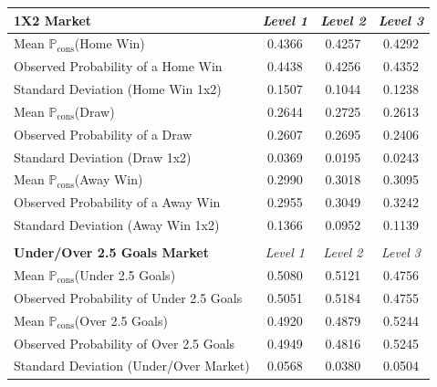\documentclass[a4paper,10pt]{report}
\begin{document}
\begin{table}[h!]\begin{center}\begin{tabular}[h!]{l||c|c|c}
\textbf{1X2 Market}& \textit{Level 1}& \textit{Level 2}& \textit{Level 3} \\ \hline
Mean $\mathbb{P}_{\textrm{cons}}$(Home Win) & 0.4366 & 0.4257 & 0.4292 \\ 
Observed Probability of a Home Win 			& 0.4438 & 0.4256 & 0.4352 \\ \hdashline
Standard Deviation (Home Win 1x2)			& 0.1507 & 0.1044 & 0.1238 \\ \hline

Mean $\mathbb{P}_{\textrm{cons}}$(Draw)	 	& 0.2644 & 0.2725 & 0.2613 \\ 
Observed Probability of a Draw	 			& 0.2607 & 0.2695 & 0.2406 \\ \hdashline
Standard Deviation (Draw 1x2)				& 0.0369 & 0.0195 & 0.0243 \\ \hline

Mean $\mathbb{P}_{\textrm{cons}}$(Away Win) & 0.2990 & 0.3018 & 0.3095 \\ 
Observed Probability of a Away Win	 		& 0.2955 & 0.3049 & 0.3242 \\ \hdashline
Standard Deviation (Away Win 1x2)			& 0.1366 & 0.0952 & 0.1139 \\ \hline \hline

\multicolumn{4}{l}{ } \\\hline
\textbf{Under/Over 2.5 Goals Market}& \textit{Level 1}&\textit{Level 2}& \textit{Level 3} \\ \hline
Mean $\mathbb{P}_{\textrm{cons}}$(Under 2.5 Goals)	& 0.5080 & 0.5121 & 0.4756 \\
Observed Probability of Under 2.5 Goals		& 0.5051 & 0.5184 & 0.4755 \\\hline
Mean $\mathbb{P}_{\textrm{cons}}$(Over 2.5 Goals)		& 0.4920 & 0.4879 & 0.5244 \\
Observed Probability of Over 2.5 Goals			& 0.4949 & 0.4816 & 0.5245 \\ \hdashline
Standard Deviation (Under/Over Market)		& 0.0568 & 0.0380 & 0.0504 \\ \hline \hline


\end{tabular}
\end{center}
\end{table}
\end{document}
